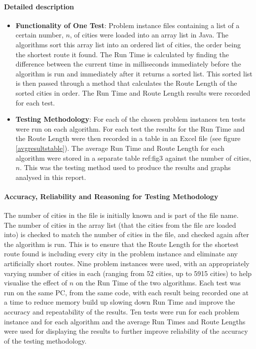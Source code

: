 \documentclass[conference,backref=page]{acmsiggraph}
\begin{document}
\paragraph{Detailed description}
\begin{itemize}
\item {\bf Functionality of One Test}: Problem instance files containing a list of a certain number, $n$, of cities were loaded into an array list in Java. The algorithms sort this array list into an ordered list of cities, the order being the shortest route it found. The Run Time is calculated by finding the difference between the current time in milliseconds immediately before the algorithm is run and immediately after it returns a sorted list. This sorted list is then passed through a method that calculates the Route Length of the sorted cities in order. The Run Time and Route Length results were recorded for each test.
\item {\bf Testing Methodology}: For each of the chosen problem instances ten tests were run on each algorithm. For each test the results for the Run Time and the Route Length were then recorded in a table in an Excel file (see figure \ref{avgresultstable}). The average Run Time and Route Length for each algorithm were stored in a separate table ref:fig3 against the number of cities, $n$. This was the testing method used to produce the results and graphs analysed in this report.
\end{itemize}

\paragraph{Accuracy, Reliability and Reasoning for Testing Methodology}
 The number of cities in the file is initially known and is part of the file name. The number of cities in the array list (that the cities from the file are loaded into) is checked to match the number of cities in the file, and checked again after the algorithm is run. This is to ensure that the Route Length for the shortest route found is including every city in the problem instance and eliminate any artificially short routes. Nine problem instances were used, with an appropriately varying number of cities in each (ranging from 52 cities, up to 5915 cities) to help visualise the effect of $n$ on the Run Time of the two algorithms. Each test was run on the same PC, from the same code, with each result being recorded one at a time to reduce memory build up slowing down Run Time and improve the accuracy and repeatability of the results. Ten tests were run for each problem instance and for each algorithm and the average Run Times and Route Lengths were used for displaying the results to further improve reliability of the accuracy of the testing methodology.
\end{document}
